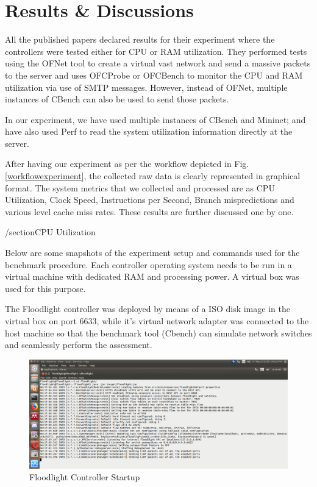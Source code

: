 \chapter{Results \& Discussions}

All the published papers declared results for their experiment where the controllers were tested either for CPU or RAM utilization. They performed tests using the OFNet tool to create a virtual vast network and send a massive packets to the server and uses OFCProbe or OFCBench to monitor the CPU and RAM utilization via use of SMTP messages. However, instead of OFNet, multiple instances of CBench can also be used to send those packets.

In our experiment, we have used multiple instances of CBench and Mininet; and have also used Perf to read the system utilization information directly at the server.

After having our experiment as per the workflow depicted in Fig. \ref{workflowexperiment}, the collected raw data is clearly represented in graphical format. The system metrics that we collected and processed are as CPU Utilization, Clock Speed, Instructions per Second, Branch mispredictions and various level cache miss rates. These results are further discussed one by one.

/section{CPU Utilization}

Below are some snapshots of the experiment setup and commands used for the benchmark procedure.
Each controller operating system needs to be run in a virtual machine with dedicated RAM and processing power. A virtual box was used for this purpose.

The Floodlight controller was deployed by means of a ISO disk image in the virtual box on port 6633, while it's virtual network adapter was connected to the host machine so that the benchmark tool (Cbench) can simulate network switches and seamlessly perform the assessment.

\begin{figure}[!hbt]
        \centering
        \includegraphics[width=\textwidth,keepaspectratio]{images/FL-Ctrl.png}
        \caption{Floodlight Controller Startup}
        \label{flsetup}
\end{figure}

